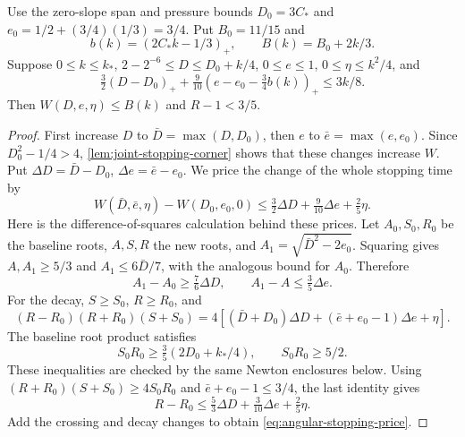\begin{lemma}\label{lem:angular-stopping-budget}
Use the zero-slope span and pressure bounds
$D_0=3C_*$ and $e_0=1/2+(3/4)(1/3)=3/4$.
Put $B_0=11/15$ and
\[
 b( k)=(2C_* k-1/3)_+,\qquad
 B( k)=B_0+2 k/3.
\]
Suppose $0\le k\le k_*$, $2-2^{-6}\le D\le D_0+ k/4$,
$0\le e\le1$, $0\le\eta\le k^2/4$, and
\begin{equation}\label{eq:angular-parameter-budget}
 \tfrac32(D-D_0)_+
 +\tfrac9{10}(e-e_0-\tfrac34b( k))_+\le3 k/8.
\end{equation}
Then $W(D,e,\eta)\le B( k)$ and $R-1<3/5$.
\end{lemma}
\begin{proof}
First increase $D$ to $\bar D=\max(D,D_0)$, then $e$ to
$\bar e=\max(e,e_0)$. Since $D_0^2-1/4>4$,
\cref{lem:joint-stopping-corner} shows that these changes increase $W$.
Put $\Delta D=\bar D-D_0$, $\Delta e=\bar e-e_0$.
We price the change of the whole stopping time by
\begin{equation}\label{eq:angular-stopping-price}
 W(\bar D,\bar e,\eta)-W(D_0,e_0,0)
 \le\tfrac32\Delta D+\tfrac9{10}\Delta e+\tfrac25\eta.
\end{equation}
Here is the difference-of-squares calculation behind these prices.
Let $A_0,S_0,R_0$ be the baseline roots, $A,S,R$ the new roots,
and $A_1=\sqrt{\bar D^2-2e_0}$. Squaring gives
$A,A_1\ge5/3$ and $A_1\le6\bar D/7$, with the analogous
bound for $A_0$. Therefore
\[
 A_1-A_0\ge\tfrac76\Delta D,\qquad
 A_1-A\le\tfrac35\Delta e.
\]
For the decay, $S\ge S_0$, $R\ge R_0$, and
\[
 (R-R_0)(R+R_0)(S+S_0)
 =4[(\bar D+D_0)\Delta D+(\bar e+e_0-1)\Delta e+\eta].
\]
The baseline root product satisfies
\[
 S_0R_0\ge\tfrac35(2D_0+ k_*/4),\qquad S_0R_0\ge5/2.
\]
These inequalities are checked by the same Newton enclosures below.
Using $(R+R_0)(S+S_0)\ge4S_0R_0$ and
$\bar e+e_0-1\le3/4$, the last identity gives
\[
 R-R_0\le\tfrac53\Delta D+\tfrac3{10}\Delta e+\tfrac25\eta.
\]
Add the crossing and decay changes to obtain
\eqref{eq:angular-stopping-price}.


\end{proof}
